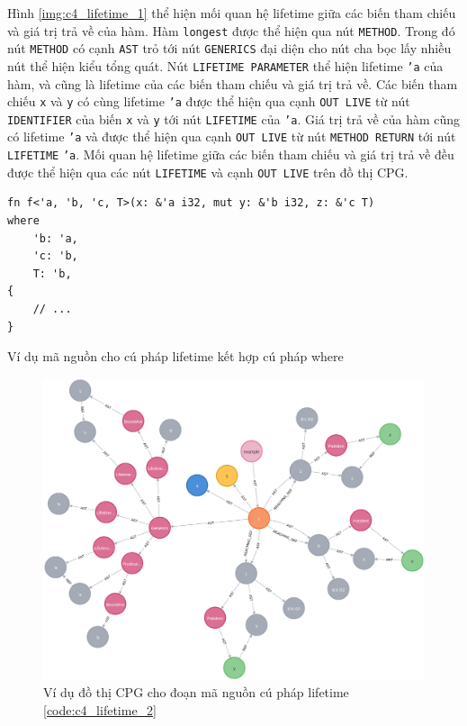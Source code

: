 Hình \ref{img:c4_lifetime_1} thể hiện mối quan hệ lifetime giữa các biến tham chiếu và giá trị trả về của hàm.
Hàm \texttt{longest} được thể hiện qua nút \texttt{METHOD}.
Trong đó nút \texttt{METHOD} có cạnh \texttt{AST} trỏ tới nút \texttt{GENERICS} đại diện cho nút cha bọc lấy nhiều nút thể hiện kiểu tổng quát.
Nút \texttt{LIFETIME PARAMETER} thể hiện lifetime \texttt{'a} của hàm, và cũng là lifetime của các biến tham chiếu và giá trị trả về.
Các biến tham chiếu \texttt{x} và \texttt{y} có cùng lifetime \texttt{'a} được thể hiện qua cạnh \texttt{OUT LIVE} từ nút \texttt{IDENTIFIER} của biến \texttt{x} và \texttt{y} tới nút \texttt{LIFETIME} của \texttt{'a}.
Giá trị trả về của hàm cũng có lifetime \texttt{'a} và được thể hiện qua cạnh \texttt{OUT LIVE} từ nút \texttt{METHOD RETURN} tới nút \texttt{LIFETIME} \texttt{'a}.
Mối quan hệ lifetime giữa các biến tham chiếu và giá trị trả về đều được thể hiện qua các nút \texttt{LIFETIME} và cạnh \texttt{OUT LIVE} trên đồ thị CPG.

\begin{listing}[H]
\begin{verbatim}
fn f<'a, 'b, 'c, T>(x: &'a i32, mut y: &'b i32, z: &'c T)
where
    'b: 'a,
    'c: 'b,
    T: 'b,
{
    // ...
}
\end{verbatim}
\caption{Ví dụ mã nguồn cho cú pháp lifetime kết hợp cú pháp where}
\label{code:c4_lifetime_2}
\end{listing}


\begin{figure}[H]
    \includegraphics[width=1\columnwidth]{figures/c4/c4_lifetime_2.png}
    \centering
    \caption{Ví dụ đồ thị CPG cho đoạn mã nguồn cú pháp lifetime \ref{code:c4_lifetime_2}}
    \label{img:c4_lifetime_2}
\end{figure}

